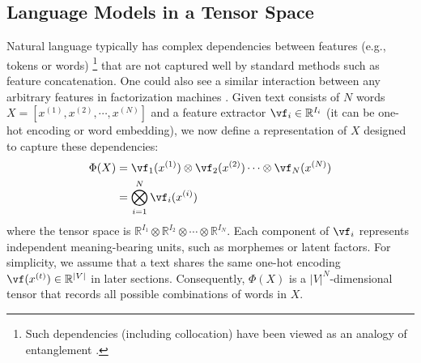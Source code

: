 \documentclass{article}
\theoremstyle{plain}
\theoremstyle{definition}
\theoremstyle{remark}
\begin{document}
\subsection{Language Models in a Tensor Space}
\label{sec:lmts}






Natural language typically has complex dependencies between features (e.g., tokens or words) \citep{hou2013mining}\footnote{Such  dependencies (including collocation) have been viewed as an analogy of entanglement \citep{hou2013mining}.} that are not captured well by standard methods such as feature concatenation.  One could also see a similar interaction between any arbitrary features in factorization machines \citep{rendle2010factorization}. Given text consists of $N$ words $X = [x^{(1)}, x^{(2)}, \cdots ,x^{(N)}]$ and a feature extractor $\vf_i \in \mathbb{R}^{I_i}$ (it can be one-hot encoding or word embedding), we now define a representation of $X$ designed to capture these dependencies:
%
\begin{equation} 
\begin{split}
    \label{eq: Phi X}
    \Phi(X) 
    &= \vf_1 (x^{(1)}) \otimes  \vf_2 (x^{(2)}) \cdots \otimes \vf_N (x^{(N)}) \\
    &= \bigotimes^N_{i=1} \vf_i (x^{(i)}) \\
\end{split}
\end{equation}
%
where the tensor space is  $\mathbb{R}^{I_1}\otimes\mathbb{R}^{I_2} \otimes\cdots\otimes\mathbb{R}^{I_N}$. Each component of $\vf_i$ represents independent meaning-bearing units, such as morphemes or latent factors.  For simplicity, we assume that a text shares the same one-hot encoding $\vf(x^{(t)}) \in \mathbb{R}^{|V|}$ in later sections. Consequently, $\Phi(X)$ is a $|V|^N$-dimensional tensor that records all possible combinations of words in $X$. 
\end{document}
